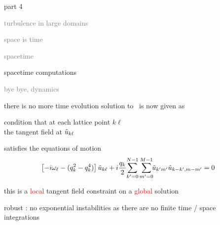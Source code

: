 \begin{frame}{part 4}
\begin{enumerate}
              \item
    \textcolor{gray}{\small
turbulence in large domains
              \item
space is time
              \item
spacetime    }
              \item {\Large
spacetime computations
    }\textcolor{gray}{\small
              \item
bye bye, dynamics
                    }
            \end{enumerate}
\end{frame}

\begin{frame}{there is no more time evolution}
solution to \KS\ is now given as
\begin{block}{condition that}
at each lattice point $k\ell$ \\
the tangent field at $\tilde{u}_{k\ell}$
\end{block}
satisfies the equations of motion
\[
\left[- i \omega_\ell - ( q_k^2 - q_k^4 ) \right]\tilde{u}_{k\ell}
+ i \frac{q_k}{2} \!\sum_{k'=0}^{N-1} \sum^{M-1}_{m'=0}\!\!
\tilde{u}_{k'm'} \tilde{u}_{k-k',m-m'}
    =
0
\]

\bigskip

this is a \textcolor{red}{local} tangent field constraint on a \textcolor{red}{global} solution

\bigskip

robust : no exponential instabilities as there are no finite time / space integrations

\end{frame}

